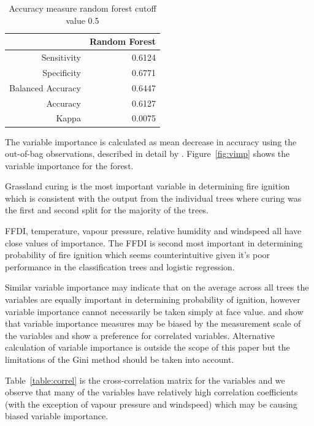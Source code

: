\documentclass[11pt,a4paper]{article}
\begin{document}
\begin{table}
  \centering
  \begin{tabular}{rr}
    \toprule
                      & Random Forest \\
    \midrule
    Sensitivity       & 0.6124 \\
    Specificity       & 0.6771 \\
    Balanced Accuracy & 0.6447 \\
    Accuracy          & 0.6127 \\
    Kappa             & 0.0075 \\
    \bottomrule
  \end{tabular}
  \caption{Accuracy measure random forest cutoff value 0.5}
  \label{table:accrf}
\end{table}

The variable importance is calculated as mean decrease in accuracy using the out-of-bag observations, described in detail by \citet{archer08}. Figure~\ref{fig:vimp} shows the variable importance for the forest.

Grassland curing is the most important variable in determining fire ignition which is consistent with the output from the individual trees where curing was the first and second split for the majority of the trees.

FFDI, temperature, vapour pressure, relative humidity and windspeed all have close values of importance. The FFDI is second most important in determining probability of fire ignition which seems counterintuitive given it's poor performance in the classification trees and logistic regression.

Similar variable importance may indicate that on the average across all trees the variables are equally important in determining probability of ignition, however variable importance cannot necessarily be taken simply at face value. \citet{strob07}  and \citet{strob08} show that variable importance measures may be biased by the measurement scale of the variables and show a preference for correlated variables. Alternative calculation of variable importance is outside the scope of this paper but the limitations of the Gini method should be taken into account.

Table~\ref{table:correl} is the cross-correlation matrix for the variables and we observe that many of the variables have relatively high correlation coefficients (with the exception of vapour pressure and windspeed) which may be causing biased variable importance.
\end{document}
